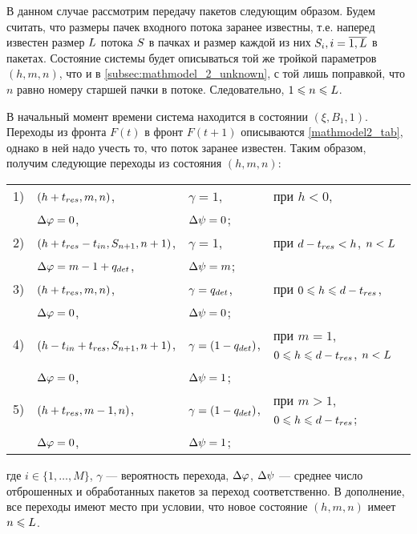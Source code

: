 В данном случае рассмотрим передачу пакетов следующим образом. Будем считать, что размеры пачек входного потока  заранее известны, т.е. наперед известен размер $L$ потока $S$ в пачках и размер каждой из них $S_i, i = \overline{1, L}$ в пакетах. Состояние системы будет описываться той же тройкой параметров $(h,m,n)$, что и в \ref{subsec:mathmodel_2_unknown}, с той лишь поправкой, что $n$ равно номеру старшей пачки в потоке. Следовательно, $1 \leqslant n \leqslant L$.

В начальный момент времени система находится в состоянии $(\xi, B_1, 1)$. Переходы из фронта $F(t)$ в фронт $F(t+1)$ описываются \ref{mathmodel2_tab}, однако в ней надо учесть то, что поток заранее известен. Таким образом, получим следующие переходы из состояния $(h, m, n)$:

\begin{tabular}{l l l l}
\label{mathmodel2_tab_know}
1)	&$(h + t_{res}, m, n)$,	&$\gamma = 1$,	&при $h < 0$,\\
	&$\Delta\varphi = 0$,		&$\Delta\psi = 0$;\\
2)	&$(h + t_{res} - t_{in}, S_{n+1}, n + 1)$,		&$\gamma = 1$,	&при $d - t_{res}< h$, $n < L$\\
	&$\Delta\varphi = m - 1 + q_{det}$,	&$\Delta\psi = m$;\\
3)	&$(h + t_{res}, m, n)$,	&$\gamma = q_{det}$,	&при $0 \leqslant h \leqslant d - t_{res}$,\\
	&$\Delta\varphi = 0$,		&$\Delta\psi = 0$;\\
4)	&$(h - t_{in} + t_{res}, S_{n+1}, n+1)$,		&$\gamma = ( 1 - q_{det})$,	&при $m = 1$, $0 \leqslant h \leqslant d - t_{res}$, $n < L$\\
	&$\Delta\varphi = 0$,		&$\Delta\psi = 1$;\\
5)	&$(h + t_{res}, m - 1, n)$,	&$\gamma = ( 1 - q_{det})$,	&при $m > 1$, $0 \leqslant h \leqslant d - t_{res}$;\\
	&$\Delta\varphi = 0$,		&$\Delta\psi = 1$;\\
\end{tabular} \newline
где $i\in\{1,\ldots,M\}$, $\gamma$ --- вероятность перехода, 	$\Delta\varphi$, $\Delta\psi$ --- среднее число отброшенных и обработанных пакетов за переход соответственно. В дополнение, все переходы имеют место при условии, что новое состояние $(h,m,n)$ имеет $n \leqslant L$.


